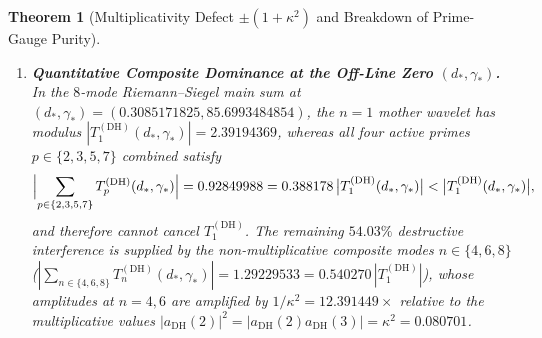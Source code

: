 \documentclass[11pt,reqno]{amsart}
\newtheorem{theorem}{Theorem}[section]
\theoremstyle{definition}
\theoremstyle{remark}
\numberwithin{equation}{section}
\newcommand{\DHf}{\mathrm{DH}}
\begin{document}
\begin{theorem}[Multiplicativity Defect $\pm(1+\kappa^2)$ and Breakdown of Prime-Gauge Purity]
\begin{enumerate}[label=\textup{(\roman*)},leftmargin=2.2em]
\item \textbf{Quantitative Composite Dominance at the Off-Line Zero $(d_*, \gamma_*)$.} In the $8$-mode Riemann--Siegel main sum at $(d_*, \gamma_*) = (0.3085171825, 85.6993484854)$, the $n = 1$ mother wavelet has modulus $|T_1^{(\DHf)}(d_*, \gamma_*)| = 2.39194369$, whereas all four active primes $p \in \{2, 3, 5, 7\}$ combined satisfy
\begin{equation}\label{eq:prime_vs_comp_anatomy}
\Bigl|\sum_{p \in \{2,3,5,7\}} T_p^{(\DHf)}(d_*, \gamma_*)\Bigr| = 0.92849988 = 0.388178\,\bigl|T_1^{(\DHf)}(d_*, \gamma_*)\bigr| < \bigl|T_1^{(\DHf)}(d_*, \gamma_*)\bigr|,
\end{equation}
and therefore cannot cancel $T_1^{(\DHf)}$. The remaining $54.03\%$ destructive interference is supplied by the non-multiplicative composite modes $n \in \{4, 6, 8\}$ ($|\sum_{n \in \{4,6,8\}} T_n^{(\DHf)}(d_*, \gamma_*)| = 1.29229533 = 0.540270\,|T_1^{(\DHf)}|$), whose amplitudes at $n = 4, 6$ are amplified by $1/\kappa^2 = 12.391449\times$ relative to the multiplicative values $|a_{\DHf}(2)|^2 = |a_{\DHf}(2)a_{\DHf}(3)| = \kappa^2 = 0.080701$.
\end{enumerate}
\end{theorem}
\end{document}
